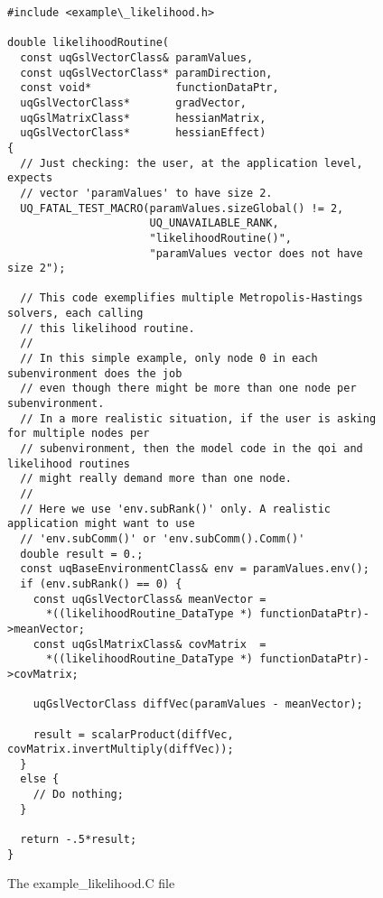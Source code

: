 \begin{figure}[h!]
\begin{center}
\begin{verbatim}
#include <example\_likelihood.h>

double likelihoodRoutine(
  const uqGslVectorClass& paramValues,
  const uqGslVectorClass* paramDirection,
  const void*             functionDataPtr,
  uqGslVectorClass*       gradVector,
  uqGslMatrixClass*       hessianMatrix,
  uqGslVectorClass*       hessianEffect)
{
  // Just checking: the user, at the application level, expects
  // vector 'paramValues' to have size 2.
  UQ_FATAL_TEST_MACRO(paramValues.sizeGlobal() != 2,
                      UQ_UNAVAILABLE_RANK,
                      "likelihoodRoutine()",
                      "paramValues vector does not have size 2");

  // This code exemplifies multiple Metropolis-Hastings solvers, each calling
  // this likelihood routine.
  //
  // In this simple example, only node 0 in each subenvironment does the job
  // even though there might be more than one node per subenvironment.
  // In a more realistic situation, if the user is asking for multiple nodes per
  // subenvironment, then the model code in the qoi and likelihood routines
  // might really demand more than one node.
  //
  // Here we use 'env.subRank()' only. A realistic application might want to use
  // 'env.subComm()' or 'env.subComm().Comm()'
  double result = 0.;
  const uqBaseEnvironmentClass& env = paramValues.env();
  if (env.subRank() == 0) {
    const uqGslVectorClass& meanVector =
      *((likelihoodRoutine_DataType *) functionDataPtr)->meanVector;
    const uqGslMatrixClass& covMatrix  =
      *((likelihoodRoutine_DataType *) functionDataPtr)->covMatrix;

    uqGslVectorClass diffVec(paramValues - meanVector);

    result = scalarProduct(diffVec, covMatrix.invertMultiply(diffVec));
  }
  else {
    // Do nothing;
  }

  return -.5*result;
}
\end{verbatim}
\end{center}
\caption{
The example\_likelihood.C file
}
\label{fig-like-c}
\end{figure}

